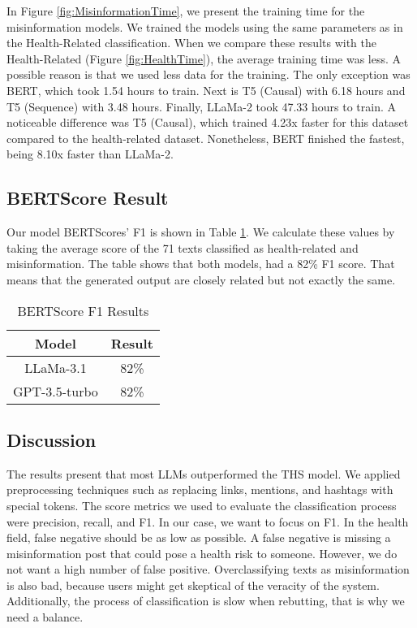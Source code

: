 In Figure \ref{fig:MisinformationTime}, we present the training time for the misinformation models. We trained the models using the same parameters as in the Health-Related classification.
When we compare these results with the Health-Related (Figure \ref{fig:HealthTime}), the average training time was less. A possible reason is that we used less data for the training. The
only exception was BERT, which took 1.54 hours to train. Next is T5 (Causal) with 6.18 hours and T5 (Sequence) with 3.48 hours. Finally, LLaMa-2 took 47.33 hours to train. A
noticeable difference was T5 (Causal), which trained 4.23x faster for this dataset compared to the health-related dataset. Nonetheless, BERT finished the fastest, being 8.10x faster than LLaMa-2.

\subsection{BERTScore Result}

Our model BERTScores'  F1 is shown in Table \ref{table:BERTScore}. We calculate these values by taking the average score of the 71 texts classified as health-related and misinformation. The table shows that both models, had a 82\% F1 score. That means that the generated output are closely related but not exactly the same. 

\begin{table}[H]
	\centering
	\caption{BERTScore F1 Results}
	\begin{tabular}{||c | c||} 
		\hline
		\textbf{Model} & \textbf{Result} \\ [0.5ex] 
		\hline
		LLaMa-3.1 & 82\%  \\
		\hline
		GPT-3.5-turbo & 82\% \\ 		
		\hline
		\end{tabular}
	\label{table:BERTScore}
\end{table}

\subsection{Discussion}

The results present that most LLMs outperformed the THS model. We applied preprocessing techniques such as replacing links, mentions, and hashtags with special tokens.
The score metrics we used to evaluate the classification process were precision, recall, and F1. In our case, we want to focus on F1. In the health field, false negative should be
as low as possible. A false negative is missing a misinformation post that could pose a health risk to someone. However, we do not want a high number of false positive. Overclassifying 
texts as misinformation is also bad, because users might get skeptical of the veracity of the system. Additionally, the process of classification is slow when rebutting, that is why we need a balance.

